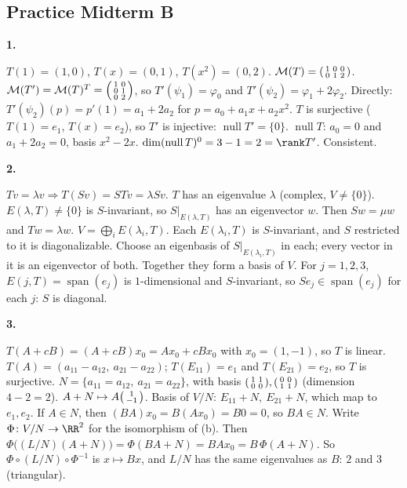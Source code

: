 \documentclass[10pt]{scrartcl}
\DeclareMathOperator{\nul}{null}
\DeclareMathOperator{\spn}{span}
\newcommand{\MM}{\mathcal M}
\begin{document}
\subsection*{Practice Midterm B}
\textbf{1.}
\begin{enumerate}[a)]
  \ii $T(1)=(1,0)$, $T(x)=(0,1)$, $T(x^2)=(0,2)$. $\MM(T)=\begin{psmallmatrix}1&0&0\\0&1&2\end{psmallmatrix}$.
  \ii $\MM(T')=\MM(T)^T=\begin{psmallmatrix}1&0\\0&1\\0&2\end{psmallmatrix}$, so $T'(\psi_1)=\varphi_0$ and $T'(\psi_2)=\varphi_1+2\varphi_2$. Directly: $T'(\psi_2)(p)=p'(1)=a_1+2a_2$ for $p=a_0+a_1x+a_2x^2$.
  \ii $T$ is surjective ($T(1)=e_1$, $T(x)=e_2$), so $T'$ is injective: $\nul T'=\{0\}$. $\nul T$: $a_0=0$ and $a_1+2a_2=0$, basis $x^2-2x$. $\dim(\nul T)^0=3-1=2=\rank T'$. Consistent.
\end{enumerate}
\textbf{2.}
\begin{enumerate}[a)]
  \ii $Tv=\lambda v\Rightarrow T(Sv)=STv=\lambda Sv$.
  \ii $T$ has an eigenvalue $\lambda$ (complex, $V\ne\{0\}$). $E(\lambda,T)\ne\{0\}$ is $S$-invariant, so $S|_{E(\lambda,T)}$ has an eigenvector $w$. Then $Sw=\mu w$ and $Tw=\lambda w$.
  \ii $V=\bigoplus_iE(\lambda_i,T)$. Each $E(\lambda_i,T)$ is $S$-invariant, and $S$ restricted to it is diagonalizable. Choose an eigenbasis of $S|_{E(\lambda_i,T)}$ in each; every vector in it is an eigenvector of both. Together they form a basis of $V$.
  \ii For $j=1,2,3$, $E(j,T)=\spn(e_j)$ is $1$-dimensional and $S$-invariant, so $Se_j\in\spn(e_j)$ for each $j$: $S$ is diagonal.
\end{enumerate}
\textbf{3.}
\begin{enumerate}[a)]
  \ii $T(A+cB)=(A+cB)x_0=Ax_0+cBx_0$ with $x_0=(1,-1)$, so $T$ is linear. $T(A)=(a_{11}-a_{12},\ a_{21}-a_{22})$; $T(E_{11})=e_1$ and $T(E_{21})=e_2$, so $T$ is surjective. $N=\{a_{11}=a_{12},\ a_{21}=a_{22}\}$, with basis $\begin{psmallmatrix}1&1\\0&0\end{psmallmatrix},\begin{psmallmatrix}0&0\\1&1\end{psmallmatrix}$ (dimension $4-2=2$).
  \ii $A+N\mapsto A\begin{psmallmatrix}1\\-1\end{psmallmatrix}$. Basis of $V/N$: $E_{11}+N,\ E_{21}+N$, which map to $e_1,e_2$.
  \ii If $A\in N$, then $(BA)x_0=B(Ax_0)=B0=0$, so $BA\in N$. Write $\Phi\colon V/N\to\RR^2$ for the isomorphism of (b). Then $\Phi\big((L/N)(A+N)\big)=\Phi(BA+N)=BAx_0=B\,\Phi(A+N)$. So $\Phi\circ(L/N)\circ\Phi^{-1}$ is $x\mapsto Bx$, and $L/N$ has the same eigenvalues as $B$: $2$ and $3$ (triangular).
\end{enumerate}
\end{document}
